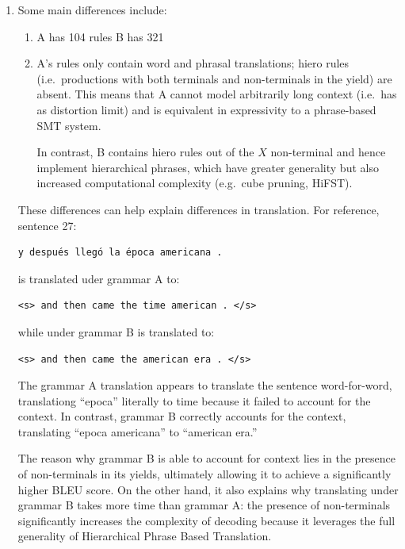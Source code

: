\documentclass[a4paper,oneside,reqno]{amsart}
\begin{document}
\begin{enumerate}[label=\arabic*.]
  \item
    Some main differences include:
    \begin{enumerate}
      \item A has 104 rules B has 321
      \item A's rules only contain word and phrasal translations; hiero rules
        (i.e.\ productions with both terminals and non-terminals in the yield)
        are absent.  This means that A cannot model arbitrarily long context
        (i.e.\ has as distortion limit) and is equivalent in expressivity to a
        phrase-based SMT system.

        In contrast, B contains hiero rules out of the $X$ non-terminal and
        hence implement hierarchical phrases, which have greater generality
        but also increased computational complexity (e.g.\ cube pruning, HiFST).
    \end{enumerate}

    These differences can help explain differences in translation. For reference,
    sentence 27:
    \begin{verbatim}
y después llegó la época americana .
    \end{verbatim}
    is translated uder grammar A to:
    \begin{verbatim}
<s> and then came the time american . </s>
    \end{verbatim}
    while under grammar B is translated to:
    \begin{verbatim}
<s> and then came the american era . </s>
    \end{verbatim}

    The grammar A translation appears to translate the sentence word-for-word,
    translationg ``epoca'' literally to time because it failed to account for
    the context. In contrast, grammar B correctly accounts for the context,
    translating ``epoca americana'' to ``american era.''

    The reason why grammar B is able to account for context lies in the presence
    of non-terminals in its yields, ultimately allowing it to achieve
    a significantly higher BLEU score. On the other hand, it also explains
    why translating under grammar B takes more time than grammar A: the presence
    of non-terminals significantly increases the complexity of decoding because
    it leverages the full generality of Hierarchical Phrase Based Translation.


\end{enumerate}
\end{document}

